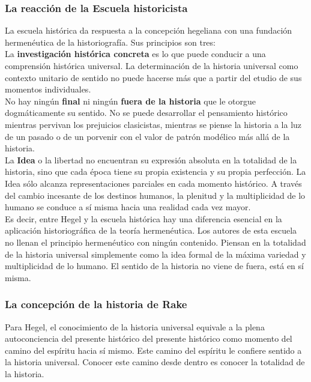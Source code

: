\documentclass[a4paper, 11pt, twocolumn, spanish]{article}
\begin{document}
\subsubsection{La reacción de la Escuela historicista}
\label{sec:org7b0ebca}
La escuela histórica da respuesta a la concepción hegeliana con una
fundación hermenéutica de la historiografía. Sus principios son
tres:\\[0pt]
La \textbf{investigación histórica concreta} es lo que puede conducir a una
comprensión histórica universal. La determinación de la historia
universal como contexto unitario de sentido no puede hacerse más que a
partir del etudio de sus momentos individuales.\\[0pt]
No hay ningún \textbf{final} ni ningún \textbf{fuera de la historia} que le otorgue
dogmáticamente su sentido. No se puede desarrollar el pensamiento
histórico mientras pervivan los prejuicios clasicistas, mientras se
piense la historia a la luz de un pasado o de un porvenir con el valor
de patrón modélico más allá de la historia.\\[0pt]
La \textbf{Idea} o la libertad no encuentran su expresión absoluta en la
totalidad de la historia, sino que cada época tiene su propia
existencia y su propia perfección. La Idea sólo alcanza
representaciones parciales en cada momento histórico. A través del
cambio incesante de los destinos humanos, la plenitud y la
multiplicidad de lo humano se conduce a sí misma hacia una realidad
cada vez mayor.\\[0pt]

Es decir, entre Hegel y la escuela histórica hay una diferencia
esencial en la aplicación historiográfica de la teoría
hermenéutica. Los autores de esta escuela no llenan el principio
hermenéutico con ningún contenido. Piensan en la totalidad de la
historia universal simplemente como la idea formal de la máxima
variedad y multiplicidad de lo humano. El sentido de la historia no
viene de fuera, está en sí misma.

\subsubsection{La concepción de la historia de Rake}
\label{sec:org2e69ae3}
Para Hegel, el conocimiento de la historia universal equivale a la
plena autoconciencia del presente histórico del presente histórico
como momento del camino del espíritu hacia sí mismo. Este camino del
espíritu le confiere sentido a la historia universal. Conocer este
camino desde dentro es conocer la totalidad de la historia.\\[0pt]
\end{document}
